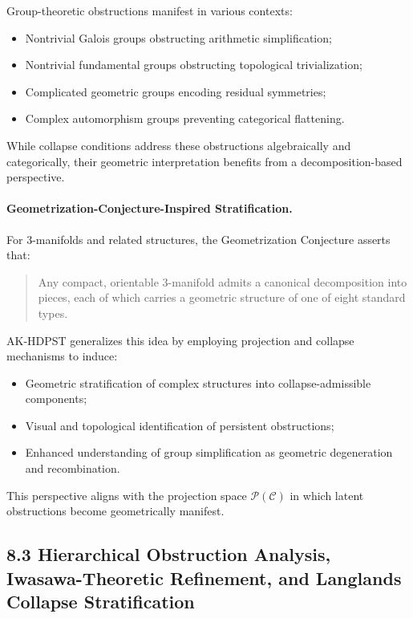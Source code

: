 \documentclass[11pt]{article}
\begin{document}
Group-theoretic obstructions manifest in various contexts:

\begin{itemize}
    \item Nontrivial Galois groups obstructing arithmetic simplification;
    \item Nontrivial fundamental groups obstructing topological trivialization;
    \item Complicated geometric groups encoding residual symmetries;
    \item Complex automorphism groups preventing categorical flattening.
\end{itemize}

While collapse conditions address these obstructions algebraically and categorically, their geometric interpretation benefits from a decomposition-based perspective.

\paragraph{Geometrization-Conjecture-Inspired Stratification.}
For 3-manifolds and related structures, the Geometrization Conjecture asserts that:

\begin{quote}
Any compact, orientable 3-manifold admits a canonical decomposition into pieces, each of which carries a geometric structure of one of eight standard types.
\end{quote}

AK-HDPST generalizes this idea by employing projection and collapse mechanisms to induce:

\begin{itemize}
    \item Geometric stratification of complex structures into collapse-admissible components;
    \item Visual and topological identification of persistent obstructions;
    \item Enhanced understanding of group simplification as geometric degeneration and recombination.
\end{itemize}

This perspective aligns with the projection space \( \mathcal{P}(\mathcal{C}) \) in which latent obstructions become geometrically manifest.

\subsection*{8.3 Hierarchical Obstruction Analysis, Iwasawa-Theoretic Refinement, and Langlands Collapse Stratification}
\end{document}
